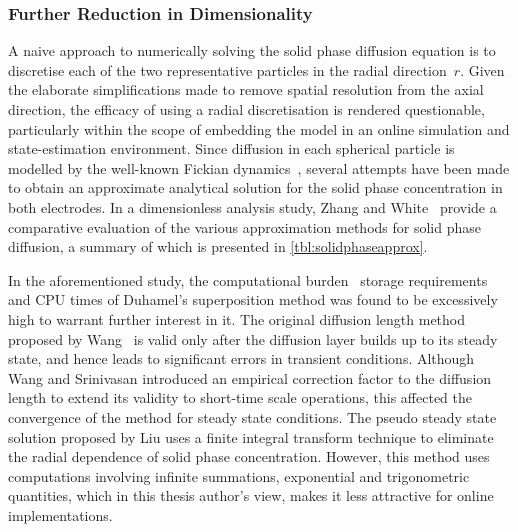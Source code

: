 

\subsubsection*{Further Reduction in Dimensionality}\label{subsec:basicspmfurtherdimensionalityreduction}

A naive approach to numerically solving the solid phase diffusion equation is to
discretise each of the two representative particles in the radial direction~$r$.
Given the elaborate  simplifications made to remove spatial  resolution from the
axial  direction, the  efficacy of  using  a radial  discretisation is  rendered
questionable, particularly within the scope of  embedding the model in an online
simulation and  state-estimation environment. Since diffusion  in each spherical
particle is modelled by the well-known Fickian dynamics~\cite{Fick1995}, several
attempts have  been made to  obtain an  approximate analytical solution  for the
solid phase concentration in both electrodes.
In a  dimensionless analysis study,  Zhang and White~\cite{Zhang2007}  provide a
comparative  evaluation of  the various  approximation methods  for solid  phase
diffusion, a summary of which is presented in \cref{tbl:solidphaseapprox}.



In the  aforementioned study, the computational  burden \ie~storage requirements
and CPU times of Duhamel's superposition method was found to be excessively high
to warrant further interest in it. The original diffusion length method proposed
by Wang~\etal{} is valid only after the  diffusion layer builds up to its steady
state, and hence  leads to significant errors in  transient conditions. Although
Wang and Srinivasan  introduced an empirical correction factor  to the diffusion
length to extend its validity to  short-time scale operations, this affected the
convergence of the  method for steady state conditions. The  pseudo steady state
solution proposed by Liu uses a finite integral transform technique to eliminate
the  radial  dependence  of  solid phase  concentration.  However,  this  method
uses computations  involving infinite summations, exponential  and trigonometric
quantities, which  in this thesis  author's view,  makes it less  attractive for
online implementations.


